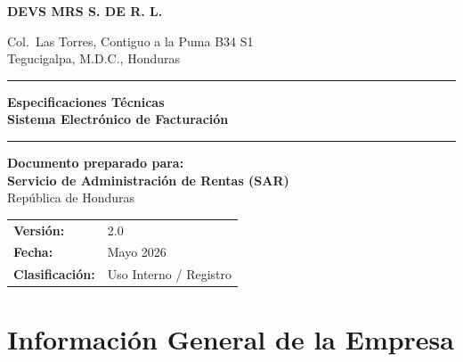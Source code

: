 \documentclass[12pt, letterpaper]{article}
\begin{document}
\begin{titlepage}
  \centering
  \vspace*{2cm}

  {\Huge\bfseries\color{azulSAR} DEVS MRS S. DE R. L.\par}
  \vspace{0.5cm}
  {\large Col.\ Las Torres, Contiguo a la Puma B34 S1\\
         Tegucigalpa, M.D.C., Honduras\par}

  \vspace{2cm}
  \rule{0.8\linewidth}{1.5pt}
  \vspace{0.4cm}

  {\LARGE\bfseries Especificaciones Técnicas\\[0.3cm]
   Sistema Electrónico de Facturación\par}

  \vspace{0.4cm}
  \rule{0.8\linewidth}{1.5pt}

  \vspace{2cm}
  {\large\textbf{Documento preparado para:}\\[0.3cm]
   \textbf{Servicio de Administración de Rentas (SAR)}\\
   República de Honduras\par}

  \vfill

  \begin{tabular}{ll}
    \textbf{Versión:}       & 2.0                    \\[4pt]
    \textbf{Fecha:}         & Mayo 2026              \\[4pt]
    \textbf{Clasificación:} & Uso Interno / Registro \\
  \end{tabular}
\end{titlepage}

\tableofcontents
\newpage

\section{Información General de la Empresa}
\end{document}
